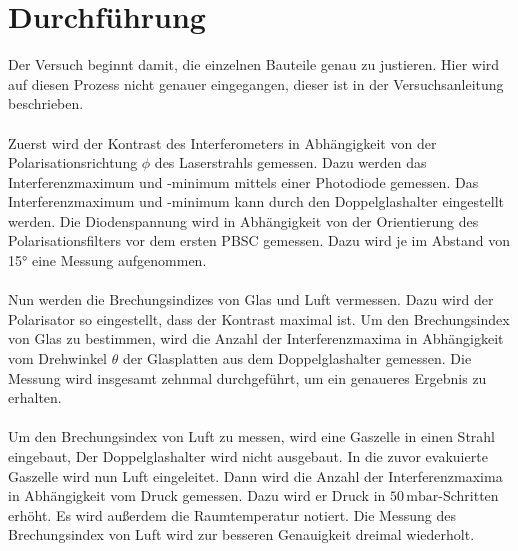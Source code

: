 \section{Durchführung}
\label{sec:Durchführung}
Der Versuch beginnt damit, die einzelnen Bauteile genau zu justieren. Hier wird auf diesen Prozess nicht genauer eingegangen, dieser ist in der Versuchsanleitung
\cite{ap64} beschrieben. \\
\\
Zuerst wird der Kontrast des Interferometers in Abhängigkeit von der Polarisationsrichtung $\phi$ des Laserstrahls gemessen. Dazu werden das Interferenzmaximum und -minimum
mittels einer Photodiode gemessen. Das Interferenzmaximum und -minimum kann durch den Doppelglashalter eingestellt werden.
Die Diodenspannung wird in Abhängigkeit von der Orientierung des Polarisationsfilters vor dem ersten PBSC gemessen. Dazu wird je im Abstand von 15° eine Messung aufgenommen.
\\
\\
Nun werden die Brechungsindizes von Glas und Luft vermessen. Dazu wird der Polarisator so eingestellt, dass der Kontrast maximal ist. 
Um den Brechungsindex von Glas zu bestimmen, wird die Anzahl der Interferenzmaxima in Abhängigkeit vom Drehwinkel 
$\theta$ der Glasplatten aus dem Doppelglashalter gemessen. Die Messung wird insgesamt zehnmal durchgeführt, um ein genaueres Ergebnis zu erhalten. \\
\\
Um den Brechungsindex von Luft zu messen, wird eine Gaszelle in einen Strahl eingebaut, 
Der Doppelglashalter wird nicht ausgebaut. In die zuvor evakuierte Gaszelle wird nun Luft eingeleitet. Dann wird die Anzahl der Interferenzmaxima in 
Abhängigkeit vom Druck gemessen. Dazu wird er Druck in $50\,\mathrm{mbar}$-Schritten erhöht. Es wird außerdem die Raumtemperatur notiert. Die Messung des Brechungsindex 
von Luft wird zur besseren Genauigkeit dreimal wiederholt.